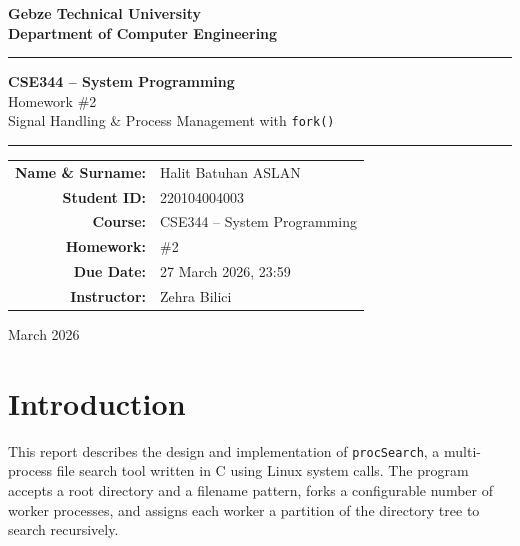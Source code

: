 \documentclass[12pt,a4paper]{article}
\begin{document}
\begin{titlepage}
    \centering
    \vspace*{1cm}

    {\Huge\bfseries\color{titleblue} Gebze Technical University\\[0.3em]
    Department of Computer Engineering}

    \vspace{1.5cm}
    \rule{\linewidth}{1pt}
    \vspace{0.5cm}

    {\LARGE\bfseries CSE344 -- System Programming}\\[0.5em]
    {\Large Homework \#2}\\[0.3em]
    {\large Signal Handling \& Process Management with \texttt{fork()}}

    \vspace{0.5cm}
    \rule{\linewidth}{1pt}
    \vspace{2cm}

    \begin{tabular}{rl}
        \textbf{Name \& Surname:} & Halit Batuhan ASLAN \\[0.4em]
        \textbf{Student ID:}      & 220104004003 \\[0.4em]
        \textbf{Course:}          & CSE344 -- System Programming \\[0.4em]
        \textbf{Homework:}        & \#2 \\[0.4em]
        \textbf{Due Date:}        & 27 March 2026, 23:59 \\[0.4em]
        \textbf{Instructor:}      & Zehra Bilici \\
    \end{tabular}

    \vfill
    {\large March 2026}
\end{titlepage}

\tableofcontents
\newpage

\section{Introduction}

This report describes the design and implementation of \texttt{procSearch}, a
multi-process file search tool written in C using Linux system calls.
The program accepts a root directory and a filename pattern, forks a
configurable number of worker processes, and assigns each worker a partition
of the directory tree to search recursively.
\end{document}
